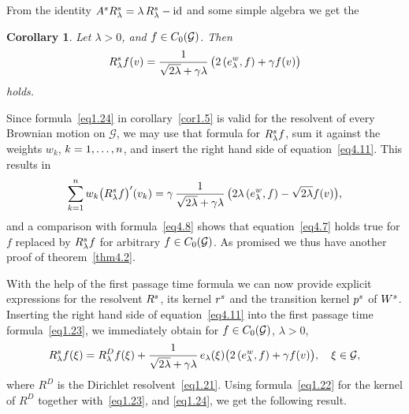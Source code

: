 \documentclass[11pt,a4paper]{amsart}
\renewcommand{\gg}{\gamma}
\newcommand{\gl}{\lambda}
\newcommand{\cG}{\mathcal{G}}
\newcommand{\1}{1}
\newtheorem{corollary}[theorem]{Corollary}
\theoremstyle{remark}
\newcommand{\sgl}{\ensuremath\sqrt{2\gl}}
\newcommand{\Co}{\ensuremath C_0(\cG)}
\newcommand{\kn}{\ensuremath k=1,\dotsc,n}
\newcommand{\Ws}{\ensuremath W^s}
\newcommand{\RsW}{\ensuremath R^s}
\newcommand{\rsW}{\ensuremath r^s}
\newcommand{\psW}{\ensuremath p^s}
\numberwithin{equation}{section}
\begin{document}
From the identity $A^s \RsW_\gl = \gl\,\RsW_\gl -\text{id}$ and some simple
algebra we get the

\begin{corollary}   \label{cor4.6}
Let $\gl>0$, and $f\in\Co$. Then
\begin{equation}    \label{eq4.11}
    \RsW_\gl f(v) = \frac{1}{\sgl+\gg\gl}\,\bigl(2\,(e^w_\gl,f)+\gg f(v)\bigr)
\end{equation}
holds.
\end{corollary}

Since formula~\eqref{eq1.24} in corollary~\ref{cor1.5} is valid for the resolvent of
every Brownian motion on $\cG$, we may use that formula for $\RsW_\gl f$, sum it
against the weights $w_k$, $\kn$, and insert the right hand side of
equation~\eqref{eq4.11}. This results in
\begin{equation*}
    \sum_{k=1}^n w_k \bigl(\RsW_\gl f\bigr)'(v_k)
        = \gg\,\frac{1}{\sgl+\gg\gl}\,\bigl(2\gl\,(e^w_\gl,f)-\sgl f(v)\bigr),
\end{equation*}
and a comparison with formula~\eqref{eq4.8} shows that equation~\eqref{eq4.7} holds
true for $f$ replaced by $\RsW_\gl f$ for arbitrary $f\in\Co$. As promised we thus
have another proof of theorem~\ref{thm4.2}.

With the help of the first passage time formula we can now provide explicit
expressions for the resolvent $\RsW$, its kernel $\rsW$ and the transition
kernel $\psW$ of $\Ws$. Inserting the right hand side of equation~\eqref{eq4.11}
into the first passage time formula~\eqref{eq1.23}, we immediately obtain for
$f\in\Co$, $\gl>0$,
\begin{equation}    \label{eq4.12}
    \RsW_\gl f(\xi)
        = R^D_\gl f(\xi) + \frac{1}{\sgl +\gg\gl}\,e_\gl(\xi)
            \bigl(2\,(e^w_\gl,f) + \gg f(v)\bigr),\quad \xi\in\cG,
\end{equation}
where $R^D$ is the Dirichlet resolvent~\eqref{eq1.21}. Using formula~\eqref{eq1.22}
for the kernel of $R^D$ together with~\eqref{eq1.23}, and \eqref{eq1.24}, we get the
following result.
\end{document}
